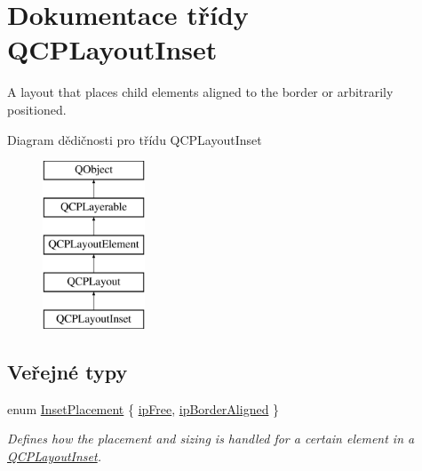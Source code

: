 \hypertarget{classQCPLayoutInset}{}\section{Dokumentace třídy Q\+C\+P\+Layout\+Inset}
\label{classQCPLayoutInset}


A layout that places child elements aligned to the border or arbitrarily positioned.  


Diagram dědičnosti pro třídu Q\+C\+P\+Layout\+Inset\begin{figure}[H]
\begin{center}
\leavevmode
\includegraphics[height=5.000000cm]{classQCPLayoutInset}
\end{center}
\end{figure}
\subsection*{Veřejné typy}
\begin{DoxyCompactItemize}
\item 
enum \hyperlink{classQCPLayoutInset_a8b9e17d9a2768293d2a7d72f5e298192}{Inset\+Placement} \{ \hyperlink{classQCPLayoutInset_a8b9e17d9a2768293d2a7d72f5e298192aa4802986ea2cea457f932b115acba59e}{ip\+Free}, 
\hyperlink{classQCPLayoutInset_a8b9e17d9a2768293d2a7d72f5e298192aa81e7df4a785ddee2229a8f47c46e817}{ip\+Border\+Aligned}
 \}\begin{DoxyCompactList}\small\item\em Defines how the placement and sizing is handled for a certain element in a \hyperlink{classQCPLayoutInset}{Q\+C\+P\+Layout\+Inset}. \end{DoxyCompactList}
\end{DoxyCompactItemize}
